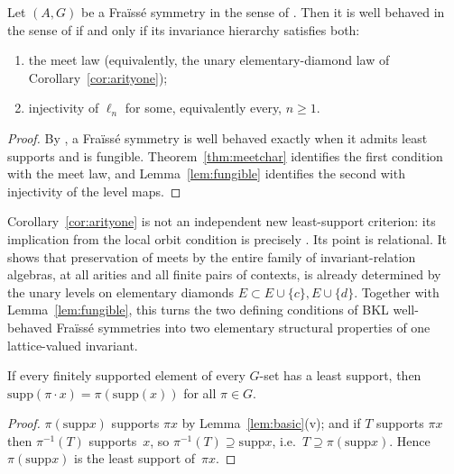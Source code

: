 \documentclass{lmcs}
\newcommand{\supp}{\mathrm{supp}}
\begin{document}
\begin{cor}\label{cor:wellbehaved}
Let $(A,G)$ be a Fra\"iss\'e symmetry in the sense of \cite[Sec.~10]{BKL14}. Then it is well behaved in the sense of \cite[Def.~10.5]{BKL14} if and only if its invariance hierarchy satisfies both:
\begin{enumerate}[label=\textup{(\alph*)}]
\item the meet law (equivalently, the unary elementary-diamond law of Corollary~\ref{cor:arityone});
\item injectivity of $\ell_n$ for some, equivalently every, $n\geq1$.
\end{enumerate}
\end{cor}
\begin{proof}
By \cite[Def.~10.5]{BKL14}, a Fra\"iss\'e symmetry is well behaved exactly when it admits least supports and is fungible. Theorem~\ref{thm:meetchar} identifies the first condition with the meet law, and Lemma~\ref{lem:fungible} identifies the second with injectivity of the level maps.
\end{proof}

\begin{rem}\label{rem:bkl-local}
Corollary~\ref{cor:arityone} is not an independent new least-support criterion: its implication from the local orbit condition is precisely \cite[Thm.~9.3]{BKL14}. Its point is relational. It shows that preservation of meets by the entire family of invariant-relation algebras, at all arities and all finite pairs of contexts, is already determined by the unary levels on elementary diamonds $E\subset E\cup\{c\},E\cup\{d\}$. Together with Lemma~\ref{lem:fungible}, this turns the two defining conditions of BKL well-behaved Fra\"iss\'e symmetries into two elementary structural properties of one lattice-valued invariant.
\end{rem}

\begin{lem}\label{lem:leastequi}
If every finitely supported element of every $G$-set has a least
support, then $\supp(\pi\cdot x)=\pi(\supp(x))$ for all $\pi\in G$.
\end{lem}

\begin{proof}
$\pi(\supp x)$ supports $\pi x$ by Lemma~\ref{lem:basic}(v); and if
$T$ supports $\pi x$ then $\pi^{-1}(T)$ supports~$x$, so
$\pi^{-1}(T)\supseteq\supp x$, i.e.\ $T\supseteq\pi(\supp x)$. Hence
$\pi(\supp x)$ is the least support of~$\pi x$.
\end{proof}
\end{document}
